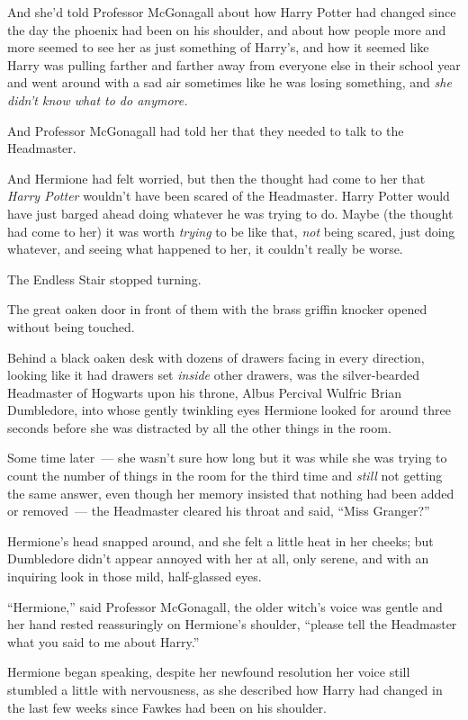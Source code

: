 And she'd told Professor McGonagall about how Harry Potter had changed since the day the phoenix had been on his shoulder, and about how people more and more seemed to see her as just something of Harry's, and how it seemed like Harry was pulling farther and farther away from everyone else in their school year and went around with a sad air sometimes like he was losing something, and \emph{she didn't know what to do anymore.}

And Professor McGonagall had told her that they needed to talk to the Headmaster.

And Hermione had felt worried, but then the thought had come to her that \emph{Harry Potter} wouldn't have been scared of the Headmaster. Harry Potter would have just barged ahead doing whatever he was trying to do. Maybe (the thought had come to her) it was worth \emph{trying} to be like that, \emph{not} being scared, just doing whatever, and seeing what happened to her, it couldn't really be worse.

The Endless Stair stopped turning.

The great oaken door in front of them with the brass griffin knocker opened without being touched.

Behind a black oaken desk with dozens of drawers facing in every direction, looking like it had drawers set \emph{inside} other drawers, was the silver-bearded Headmaster of Hogwarts upon his throne, Albus Percival Wulfric Brian Dumbledore, into whose gently twinkling eyes Hermione looked for around three seconds before she was distracted by all the other things in the room.

Some time later~--- she wasn't sure how long but it was while she was trying to count the number of things in the room for the third time and \emph{still} not getting the same answer, even though her memory insisted that nothing had been added or removed~--- the Headmaster cleared his throat and said, ``Miss Granger?''

Hermione's head snapped around, and she felt a little heat in her cheeks; but Dumbledore didn't appear annoyed with her at all, only serene, and with an inquiring look in those mild, half-glassed eyes.

``Hermione,'' said Professor McGonagall, the older witch's voice was gentle and her hand rested reassuringly on Hermione's shoulder, ``please tell the Headmaster what you said to me about Harry.''

Hermione began speaking, despite her newfound resolution her voice still stumbled a little with nervousness, as she described how Harry had changed in the last few weeks since Fawkes had been on his shoulder.

